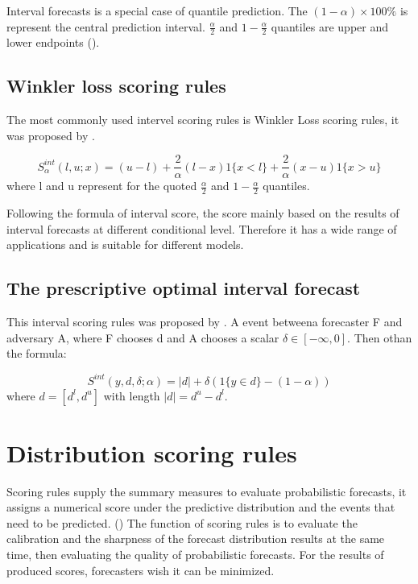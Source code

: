 \documentclass{monashthesis}
\theoremstyle{definition}
\theoremstyle{definition}
\theoremstyle{definition}
\theoremstyle{remark}
\begin{document}
Interval forecasts is a special case of quantile prediction. The
\((1-\alpha)\times100\%\) is represent the central prediction interval.
\(\frac{\alpha}{2}\) and \(1-\frac{\alpha}{2}\) quantiles are upper and
lower endpoints (\textcite{GBR07}).

\subsection{Winkler loss scoring
rules}\label{winkler-loss-scoring-rules}

The most commonly used intervel scoring rules is Winkler Loss scoring
rules, it was proposed by \textcite{W72}.

\[
  S_\alpha^{int}(l,u;x)=(u-l)+\frac{2}{\alpha}(l-x)1\{x<l\}+\frac{2}{\alpha}(x-u)1\{x>u\}
\] where l and u represent for the quoted \(\frac{\alpha}{2}\) and
\(1-\frac{\alpha}{2}\) quantiles.

Following the formula of interval score, the score mainly based on the
results of interval forecasts at different conditional level. Therefore
it has a wide range of applications and is suitable for different
models.

\subsection{The prescriptive optimal interval
forecast}\label{the-prescriptive-optimal-interval-forecast}

This interval scoring rules was proposed by \textcite{RDSS18}. A event
betweena forecaster F and adversary A, where F chooses d and A chooses a
scalar \(\delta\in[-\infty,0]\). Then othan the formula:

\[
  S^{int}(y,d,\delta;\alpha)=|d|+\delta(1\{y\in{d}\}-(1-\alpha))
\] where \(d=[d^l,d^u]\) with length \(|d|=d^u-d^l\).

\section{Distribution scoring rules}\label{distribution-scoring-rules}

Scoring rules supply the summary measures to evaluate probabilistic
forecasts, it assigns a numerical score under the predictive
distribution and the events that need to be predicted.
(\textcite{GBR07}) The function of scoring rules is to evaluate the
calibration and the sharpness of the forecast distribution results at
the same time, then evaluating the quality of probabilistic forecasts.
For the results of produced scores, forecasters wish it can be
minimized.
\end{document}
